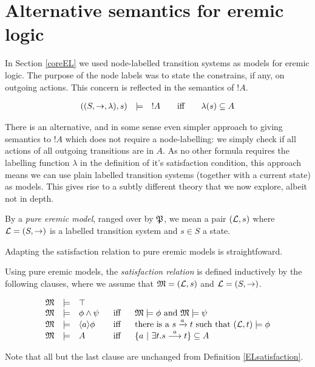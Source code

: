 \section{Alternative semantics for eremic logic}\label{pureModels}

In Section \ref{coreEL} we used node-labelled transition systems as
models for eremic logic. The purpose of the node labels was to state
the constrains, if any, on outgoing actions. This concern is reflected
in the semantics of $!A$.

\[
\begin{array}{lclcl}
  ((S, \rightarrow, \lambda), s) & \models & !A  &\mbox{\quad iff\quad } & \lambda(s) \subseteq A
\end{array}
\]

\NI There is an alternative, and in some sense even simpler approach
to giving semantics to $!A$ which does not require a node-labelling:
we simply check if all actions of all outgoing transitions are in $A$.
As no other formula requires the labelling function $\lambda$ in the
definition of it's satisfaction condition, this approach means we can
use plain labelled transition systems (together with a current state)
as models. This gives rise to a subtly different theory that we now
explore, albeit not in depth.

\begin{definition}
By a \emph{pure eremic model}, ranged over by $\frak{P}$, we mean a pair
$(\mathcal{L}, s)$ where $\mathcal{L} = (S, \rightarrow)$ is a labelled transition
system and $s \in S$ a state.
\end{definition}

\NI Adapting the satisfaction relation to pure eremic models is
straightfoward.

\begin{definition}
Using pure eremic models, the  \emph{satisfaction relation} is defined 
inductively by the following clauses, where we assume that $\frak{M} =
(\mathcal{L}, s)$ and $\mathcal{L} = (S, \rightarrow)$.

\[
\begin{array}{lclcl}
  \frak{M} & \models & \top   \\
  \frak{M} & \models & \phi \land \psi &\ \mbox{ iff } \ & \frak{M}  \models \phi \mbox { and } \frak{M} \models \psi  \\
  \frak{M} & \models & \langle a \rangle \phi & \mbox{ iff } & \text{there is a } s \xrightarrow{a} t \mbox { such that } (\mathcal{L}, t) \models \phi  \\
  \frak{M} & \models & A &\mbox{ iff } & \{a\ |\ \exists t.s \stackrel{a}{\longrightarrow} t \} \subseteq A
\end{array}
\]

\NI Note that all but the last clause are unchanged from Definition
\ref{ELsatisfaction}.
\end{definition}

